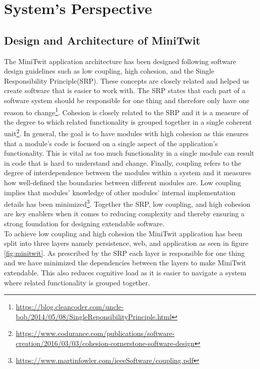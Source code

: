 \section{System's Perspective}

\subsection{Design and Architecture of MiniTwit}
The MiniTwit application architecture has been designed following software design guidelines such as low coupling, high cohesion, and the Single Responsibility Principle(SRP). 
These concepts are closely related and helped us create software that is easier to work with. The SRP states that each part of a software system should be responsible for one thing and therefore only have one reason to change\footnote{\url{https://blog.cleancoder.com/uncle-bob/2014/05/08/SingleReponsibilityPrinciple.html}}. 
Cohesion is closely related to the SRP and it is a measure of the degree to which related functionality is grouped together in a single coherent unit\footnote{\url{https://www.codurance.com/publications/software-creation/2016/03/03/cohesion-cornerstone-software-design}}. 
In general, the goal is to have modules with high cohesion as this ensures that a module's code is focused on a single aspect of the application's functionality. 
This is vital as too much functionality in a single module can result in code that is hard to understand and change. 
Finally, coupling refers to the degree of interdependence between the modules within a system and it measures how well-defined the boundaries between different modules are. 
Low coupling implies that modules' knowledge of other modules' internal implementation details has been minimized\footnote{\url{https://www.martinfowler.com/ieeeSoftware/coupling.pdf}}. 
Together the SRP, low coupling, and high cohesion are key enablers when it comes to reducing complexity and thereby ensuring a strong foundation for designing extendable software. \\

To achieve low coupling and high cohesion the MiniTwit application has been split into three layers namely persistence, web, and application as seen in figure \ref{fig:minitwit}. 
As prescribed by the SRP each layer is responsible for one thing and we have minimized the dependencies between the layers to make MiniTwit extendable.
 This also reduces cognitive load as it is easier to navigate a system where related functionality is grouped together. 


